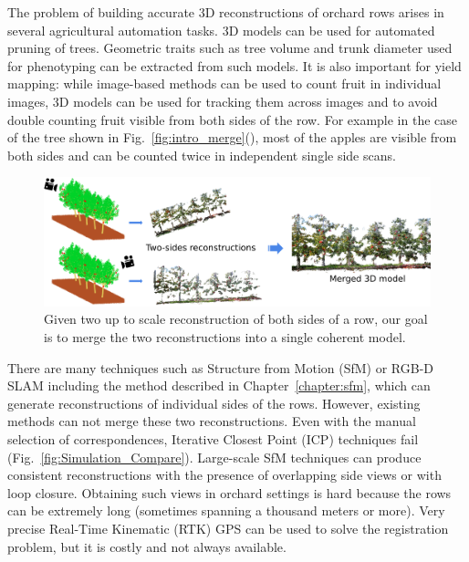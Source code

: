 The problem of building accurate 3D reconstructions of orchard rows arises in several agricultural automation tasks. 3D models can be used for automated pruning of trees. Geometric traits such as tree volume and trunk diameter used for phenotyping can be extracted from such models. It is also important for yield mapping: while image-based methods can be used to count fruit in individual images, 3D models can be used for tracking them across images and to avoid double counting fruit visible from both sides of the row. For example in the case of the tree shown in Fig.~\ref{fig:intro_merge}(), most of the apples are visible from both sides and can be counted twice in independent single side scans.

\begin{figure}[!hbpt]
    \centering
    \includegraphics[width=\textwidth]{figures/merge_both/problem_goal.png}
    \caption[Problem setup for merging reconstructions from both sides.]{ Given two up to scale reconstruction of both sides of a row, our goal is to merge the two reconstructions into a single coherent model.}
    \label{fig:intro_goal}
\end{figure}



There are many techniques such as Structure from Motion (SfM) or RGB-D SLAM \cite{sturm2012benchmark,roy2016surveying} including the method described in Chapter~\ref{chapter:sfm}, which can generate reconstructions of individual sides of the rows. However, existing methods can not merge these two reconstructions. Even with the manual selection of correspondences, Iterative Closest Point (ICP)  techniques fail (Fig.~\ref{fig:Simulation_Compare}). Large-scale SfM techniques can produce consistent reconstructions with the presence of overlapping side views or with loop closure. Obtaining such views in orchard settings is hard because the rows can be extremely long (sometimes spanning a thousand meters or more). Very precise Real-Time Kinematic (RTK) GPS can be used to solve the registration problem, but it is costly and not always available.



